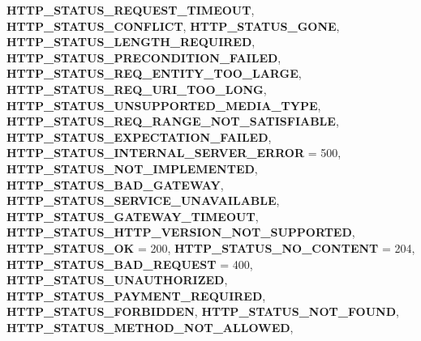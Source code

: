 \begin{DoxyCompactItemize}
{\bfseries H\+T\+T\+P\+\_\+\+S\+T\+A\+T\+U\+S\+\_\+\+R\+E\+Q\+U\+E\+S\+T\+\_\+\+T\+I\+M\+E\+O\+UT}, 
{\bfseries H\+T\+T\+P\+\_\+\+S\+T\+A\+T\+U\+S\+\_\+\+C\+O\+N\+F\+L\+I\+CT}, 
{\bfseries H\+T\+T\+P\+\_\+\+S\+T\+A\+T\+U\+S\+\_\+\+G\+O\+NE}, 
{\bfseries H\+T\+T\+P\+\_\+\+S\+T\+A\+T\+U\+S\+\_\+\+L\+E\+N\+G\+T\+H\+\_\+\+R\+E\+Q\+U\+I\+R\+ED}, 
\newline
{\bfseries H\+T\+T\+P\+\_\+\+S\+T\+A\+T\+U\+S\+\_\+\+P\+R\+E\+C\+O\+N\+D\+I\+T\+I\+O\+N\+\_\+\+F\+A\+I\+L\+ED}, 
{\bfseries H\+T\+T\+P\+\_\+\+S\+T\+A\+T\+U\+S\+\_\+\+R\+E\+Q\+\_\+\+E\+N\+T\+I\+T\+Y\+\_\+\+T\+O\+O\+\_\+\+L\+A\+R\+GE}, 
{\bfseries H\+T\+T\+P\+\_\+\+S\+T\+A\+T\+U\+S\+\_\+\+R\+E\+Q\+\_\+\+U\+R\+I\+\_\+\+T\+O\+O\+\_\+\+L\+O\+NG}, 
{\bfseries H\+T\+T\+P\+\_\+\+S\+T\+A\+T\+U\+S\+\_\+\+U\+N\+S\+U\+P\+P\+O\+R\+T\+E\+D\+\_\+\+M\+E\+D\+I\+A\+\_\+\+T\+Y\+PE}, 
\newline
{\bfseries H\+T\+T\+P\+\_\+\+S\+T\+A\+T\+U\+S\+\_\+\+R\+E\+Q\+\_\+\+R\+A\+N\+G\+E\+\_\+\+N\+O\+T\+\_\+\+S\+A\+T\+I\+S\+F\+I\+A\+B\+LE}, 
{\bfseries H\+T\+T\+P\+\_\+\+S\+T\+A\+T\+U\+S\+\_\+\+E\+X\+P\+E\+C\+T\+A\+T\+I\+O\+N\+\_\+\+F\+A\+I\+L\+ED}, 
{\bfseries H\+T\+T\+P\+\_\+\+S\+T\+A\+T\+U\+S\+\_\+\+I\+N\+T\+E\+R\+N\+A\+L\+\_\+\+S\+E\+R\+V\+E\+R\+\_\+\+E\+R\+R\+OR} = 500, 
{\bfseries H\+T\+T\+P\+\_\+\+S\+T\+A\+T\+U\+S\+\_\+\+N\+O\+T\+\_\+\+I\+M\+P\+L\+E\+M\+E\+N\+T\+ED}, 
\newline
{\bfseries H\+T\+T\+P\+\_\+\+S\+T\+A\+T\+U\+S\+\_\+\+B\+A\+D\+\_\+\+G\+A\+T\+E\+W\+AY}, 
{\bfseries H\+T\+T\+P\+\_\+\+S\+T\+A\+T\+U\+S\+\_\+\+S\+E\+R\+V\+I\+C\+E\+\_\+\+U\+N\+A\+V\+A\+I\+L\+A\+B\+LE}, 
{\bfseries H\+T\+T\+P\+\_\+\+S\+T\+A\+T\+U\+S\+\_\+\+G\+A\+T\+E\+W\+A\+Y\+\_\+\+T\+I\+M\+E\+O\+UT}, 
{\bfseries H\+T\+T\+P\+\_\+\+S\+T\+A\+T\+U\+S\+\_\+\+H\+T\+T\+P\+\_\+\+V\+E\+R\+S\+I\+O\+N\+\_\+\+N\+O\+T\+\_\+\+S\+U\+P\+P\+O\+R\+T\+ED}, 
\newline
{\bfseries H\+T\+T\+P\+\_\+\+S\+T\+A\+T\+U\+S\+\_\+\+OK} = 200, 
{\bfseries H\+T\+T\+P\+\_\+\+S\+T\+A\+T\+U\+S\+\_\+\+N\+O\+\_\+\+C\+O\+N\+T\+E\+NT} = 204, 
{\bfseries H\+T\+T\+P\+\_\+\+S\+T\+A\+T\+U\+S\+\_\+\+B\+A\+D\+\_\+\+R\+E\+Q\+U\+E\+ST} = 400, 
{\bfseries H\+T\+T\+P\+\_\+\+S\+T\+A\+T\+U\+S\+\_\+\+U\+N\+A\+U\+T\+H\+O\+R\+I\+Z\+ED}, 
\newline
{\bfseries H\+T\+T\+P\+\_\+\+S\+T\+A\+T\+U\+S\+\_\+\+P\+A\+Y\+M\+E\+N\+T\+\_\+\+R\+E\+Q\+U\+I\+R\+ED}, 
{\bfseries H\+T\+T\+P\+\_\+\+S\+T\+A\+T\+U\+S\+\_\+\+F\+O\+R\+B\+I\+D\+D\+EN}, 
{\bfseries H\+T\+T\+P\+\_\+\+S\+T\+A\+T\+U\+S\+\_\+\+N\+O\+T\+\_\+\+F\+O\+U\+ND}, 
{\bfseries H\+T\+T\+P\+\_\+\+S\+T\+A\+T\+U\+S\+\_\+\+M\+E\+T\+H\+O\+D\+\_\+\+N\+O\+T\+\_\+\+A\+L\+L\+O\+W\+ED}, 

\end{DoxyCompactItemize}
